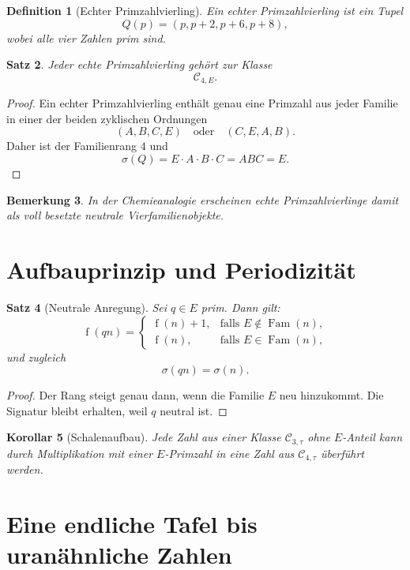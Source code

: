 \documentclass[12pt,a4paper]{article}
\newtheorem{satz}{Satz}[section]
\newtheorem{korollar}[satz]{Korollar}
\newtheorem{definition}[satz]{Definition}
\newtheorem{bemerkung}[satz]{Bemerkung}
\newcommand{\Fam}{\operatorname{Fam}}
\newcommand{\sign}{\sigma}
\newcommand{\rank}{\operatorname{f}}
\begin{document}
	\begin{definition}[Echter Primzahlvierling]
		Ein echter Primzahlvierling ist ein Tupel
		\[
		Q(p)=(p,p+2,p+6,p+8),
		\]
		wobei alle vier Zahlen prim sind.
	\end{definition}
	
	\begin{satz}
		Jeder echte Primzahlvierling gehört zur Klasse
		\[
		\mathcal C_{4,E}.
		\]
	\end{satz}
	
	\begin{proof}
		Ein echter Primzahlvierling enthält genau eine Primzahl aus jeder Familie in einer der beiden zyklischen Ordnungen
		\[
		(A,B,C,E)\quad\text{oder}\quad(C,E,A,B).
		\]
		Daher ist der Familienrang $4$ und
		\[
		\sign(Q)=E\cdot A\cdot B\cdot C=ABC=E.
		\]
	\end{proof}
	
	\begin{bemerkung}
		In der Chemieanalogie erscheinen echte Primzahlvierlinge damit als \emph{voll besetzte neutrale Vierfamilienobjekte}.
	\end{bemerkung}
	
	\section{Aufbauprinzip und Periodizität}
	
	\begin{satz}[Neutrale Anregung]
		Sei $q\in E$ prim. Dann gilt:
		\[
		\rank(qn)=
		\begin{cases}
			\rank(n)+1, & \text{falls }E\notin \Fam(n),\\
			\rank(n), & \text{falls }E\in \Fam(n),
		\end{cases}
		\]
		und zugleich
		\[
		\sign(qn)=\sign(n).
		\]
	\end{satz}
	
	\begin{proof}
		Der Rang steigt genau dann, wenn die Familie $E$ neu hinzukommt. Die Signatur bleibt erhalten, weil $q$ neutral ist.
	\end{proof}
	
	\begin{korollar}[Schalenaufbau]
		Jede Zahl aus einer Klasse $\mathcal C_{3,\tau}$ ohne $E$-Anteil kann durch Multiplikation mit einer $E$-Primzahl in eine Zahl aus $\mathcal C_{4,\tau}$ überführt werden.
	\end{korollar}
	
	\section{Eine endliche Tafel bis uranähnliche Zahlen}
	
\end{document}
